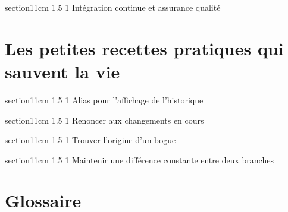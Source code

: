 \documentclass[a4paper,twoside,french]{book}
\makeatletter
\renewcommand\section{\@startsection
  {section}{1}{1cm}%
  {1.5\baselineskip}%
  {1\baselineskip}%
  {\normalfont\Large\bfseries}}%
\makeatother
\begin{document}
\section{Intégration continue et assurance qualité} %

\chapter{Les petites recettes pratiques qui sauvent la vie} %

\section{Alias pour l'affichage de l'historique} %

\section{Renoncer aux changements en cours} %

\section{Trouver l'origine d'un bogue} %

\section{Maintenir une différence constante entre deux branches} %

\appendix

\chapter{Glossaire} %

\printindex

\nocite{*}


\end{document}
